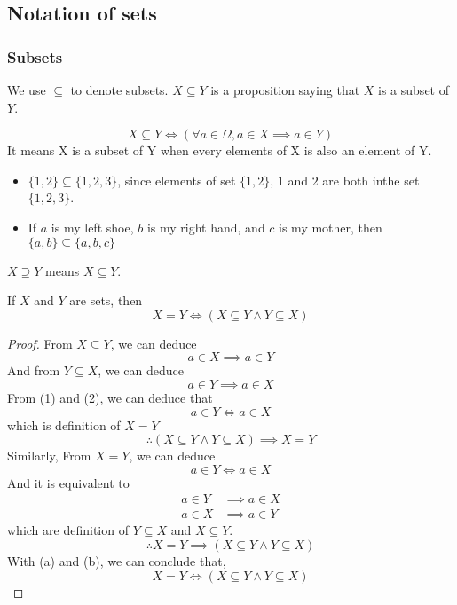 \documentclass[a4paper]{article}
\begin{document}
\subsection{Notation of sets}

\subsubsection{Subsets}
\begin{notation}
We use $\subseteq$ to denote subsets. $X \subseteq Y$ is a proposition saying that $X$ is a subset of $Y$.
\end{notation}

\begin{defi}[Subset]
\[
	X \subseteq Y \iff (\forall a \in \Omega, a \in X \implies a \in Y)
\]
It means X is a subset of Y when every elements of X is also an element of Y.
\end{defi}

\begin{eg}\leavevmode
	\begin{itemize}
		\item $\{ 1, 2 \} \subseteq \{ 1, 2, 3 \}$, since elements of set $\{ 1, 2\}$, $1$ and $2$ are both inthe set $\{ 1, 2, 3 \}$.
		\item If $a$ is my left shoe, $b$ is my right hand, and $c$ is my mother, then $\{ a, b \} \subseteq \{ a, b, c \}$
	\end{itemize}
\end{eg}

\begin{notation}
$X \supseteq Y$ means $X \subseteq Y$.
\end{notation}

\begin{thm}
If $X$ and $Y$ are sets, then
\[
	X = Y \iff (X \subseteq Y \land Y \subseteq X)
\]
\end{thm}

\begin{proof}
From $X \subseteq Y$, we can deduce 
\[
	a \in X \implies a \in Y \tag{1}
\]
And from $Y \subseteq X$, we can deduce
\[
	a \in Y \implies a \in X \tag{2}
\]
From (1) and (2), we can deduce that $$a \in Y \iff a \in X$$which is definition of $X = Y$
\[
	\therefore (X \subseteq Y \land Y \subseteq X) \implies X = Y \tag{a}
\]
Similarly, From $X = Y$, we can deduce
\[
	a \in Y \iff a \in X
\]
And it is equivalent to
\begin{align*}
	a \in Y &\implies a \in X\\
	a \in X &\implies a \in Y
\end{align*}
which are definition of $Y \subseteq X$ and $X \subseteq Y$.
\[
	\therefore X = Y \implies (X \subseteq Y \land Y \subseteq X) \tag{b}
\]
With (a) and (b), we can conclude that,
\[
	X = Y \iff (X \subseteq Y \land Y \subseteq X)
\]
\end{proof}
\end{document}
